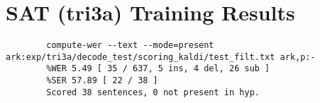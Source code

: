 \section*{SAT (tri3a) Training Results}

{\lstset{
		basicstyle=\ttfamily\small,
		frame=single,
		breaklines=true,
		breakatwhitespace=true,
		columns=fullflexible
	}
	\begin{lstlisting}
		compute-wer --text --mode=present ark:exp/tri3a/decode_test/scoring_kaldi/test_filt.txt ark,p:- 
		%WER 5.49 [ 35 / 637, 5 ins, 4 del, 26 sub ]
		%SER 57.89 [ 22 / 38 ]
		Scored 38 sentences, 0 not present in hyp.
	\end{lstlisting}
}